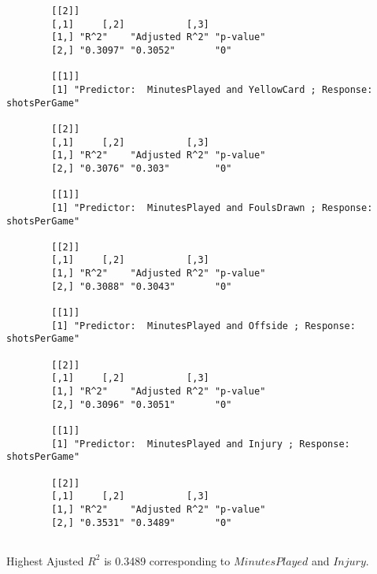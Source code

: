 \documentclass[12pt]{article}
\begin{document}
\begin{verbatim}
		[[2]]
		[,1]     [,2]           [,3]     
		[1,] "R^2"    "Adjusted R^2" "p-value"
		[2,] "0.3097" "0.3052"       "0"      
		
		[[1]]
		[1] "Predictor:  MinutesPlayed and YellowCard ; Response:  shotsPerGame"
		
		[[2]]
		[,1]     [,2]           [,3]     
		[1,] "R^2"    "Adjusted R^2" "p-value"
		[2,] "0.3076" "0.303"        "0"      
		
		[[1]]
		[1] "Predictor:  MinutesPlayed and FoulsDrawn ; Response:  shotsPerGame"
		
		[[2]]
		[,1]     [,2]           [,3]     
		[1,] "R^2"    "Adjusted R^2" "p-value"
		[2,] "0.3088" "0.3043"       "0"      
		
		[[1]]
		[1] "Predictor:  MinutesPlayed and Offside ; Response:  shotsPerGame"
		
		[[2]]
		[,1]     [,2]           [,3]     
		[1,] "R^2"    "Adjusted R^2" "p-value"
		[2,] "0.3096" "0.3051"       "0"      
		
		[[1]]
		[1] "Predictor:  MinutesPlayed and Injury ; Response:  shotsPerGame"
		
		[[2]]
		[,1]     [,2]           [,3]     
		[1,] "R^2"    "Adjusted R^2" "p-value"
		[2,] "0.3531" "0.3489"       "0"      
		
	\end{verbatim}
	Highest Ajusted $ R^2 $ is 0.3489 corresponding to $ MinutesPlayed $ and $ Injury $.
	
\end{document}
